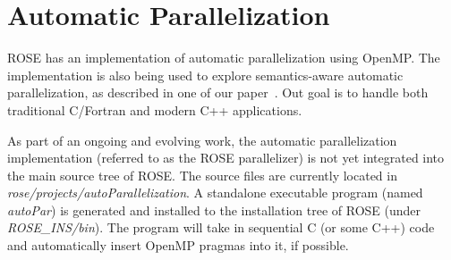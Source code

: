 \section{Automatic Parallelization}
ROSE has an implementation of automatic parallelization using OpenMP.
The implementation is also being used to explore semantics-aware automatic parallelization, as
described in one of our paper~\cite{LiaoExtending2009}.
Out goal is to handle both traditional C/Fortran and modern C++
applications.

As part of an ongoing and evolving work, the automatic parallelization
implementation (referred to as the ROSE parallelizer) is not yet integrated into the main
source tree of ROSE. 
The source files are currently located in
\textit{rose/projects/autoParallelization}.
A standalone executable program (named \textit{autoPar}) is generated and
installed to the installation tree of ROSE (under \textit{ROSE\_INS/bin}). 
The program will take in sequential C (or some C++) code and automatically
insert OpenMP pragmas into it, if possible. 
